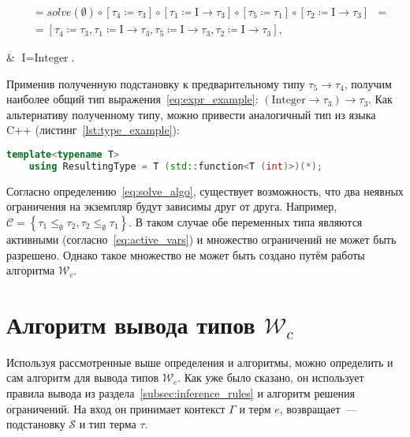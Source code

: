 \begin{equation}
\begin{aligned}
        &= solve(\emptyset)                                                                                                                                      \circ \left[ \tau_4 \coloneqq \tau_3 \right] \circ \left[ \tau_1 \coloneqq \text{I} \to \tau_3 \right] \circ \left[ \tau_5 \coloneqq \tau_1 \right] \circ \left[ \tau_2 \coloneqq \text{I} \to \tau_3 \right] &= \\
        &= \left[ \tau_4 \coloneqq \tau_3, \tau_1 \coloneqq \text{I} \to \tau_3, \tau_5 \coloneqq \text{I} \to \tau_3, \tau_2 \coloneqq \text{I} \to \tau_3 \right],
    \end{aligned}
\end{equation}
\begin{eqrem}
    & $\text{I} = \text{Integer}$.\\
\end{eqrem}

Применив полученную подстановку к предварительному типу $\tau_5 \to \tau_4$, получим наиболее общий тип выражения~\ref{eq:expr_example}: $(\text{Integer} \to \tau_3) \to \tau_3$.
Как альтернативу полученному типу, можно привести аналогичный тип из языка C++ (листинг~\ref{lst:type_example}):

\begin{lstlisting}[label={lst:type_example},language=C++,caption={Вид полученного типа с точки зрения языка C++.}]
    template<typename T>
    using ResultingType = T (std::function<T (int)>)(*);
\end{lstlisting}

Согласно определению~\ref{eq:solve_algo}, существует возможность, что два неявных ограничения на экземпляр будут зависимы друг от друга.
Например, $\mathcal{C} = \left\{ \tau_1 \leq_{\emptyset} \tau_2, \tau_2 \leq_{\emptyset} \tau_1 \right\}$.
В таком случае обе переменных типа являются активными (согласно~\ref{eq:active_vars}) и множество ограничений не может быть разрешено.
Однако такое множество не может быть создано путём работы алгоритма $\mathcal{W}_c$.


\section{Алгоритм вывода типов $\mathcal{W}_c$}
\label{sec:inference_algo}

Используя рассмотренные выше определения и алгоритмы, можно определить и сам алгоритм для вывода типов $\mathcal{W}_c$.
Как уже было сказано, он использует правила вывода из раздела~\ref{subsec:inference_rules} и алгоритм решения ограничений.
На вход он принимает контекст $\Gamma$ и терм $e$, возвращает~--- подстановку $\mathcal{S}$ и тип терма $\tau$.

